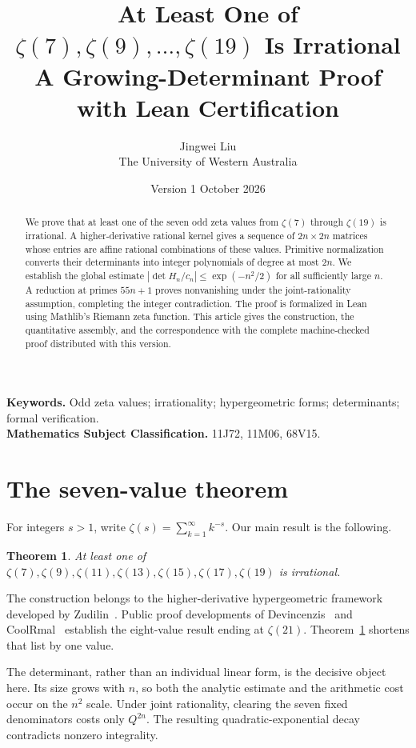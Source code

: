 \documentclass[11pt]{article}
\title{At Least One of $\zeta(7),\zeta(9),\ldots,\zeta(19)$ Is Irrational\\[5pt]
\large A Growing-Determinant Proof with Lean Certification}
\author{Jingwei Liu\\\small The University of Western Australia}
\date{Version 1\quad\textbar\quad 6 October 2026}
\newtheorem{theorem}{Theorem}[section]
\begin{document}
\maketitle
\begin{abstract}
We prove that at least one of the seven odd zeta values from
$\zeta(7)$ through $\zeta(19)$ is irrational.
A higher-derivative rational kernel gives a sequence of
$2n\times2n$ matrices whose entries are affine rational combinations of
these values. Primitive normalization converts their determinants into
integer polynomials of degree at most $2n$. We establish the global estimate
$|\det H_n/c_n|\leq \exp(-n^2/2)$ for all sufficiently large $n$.
A reduction at primes $55n+1$ proves nonvanishing under the joint-rationality
assumption, completing the integer contradiction. The proof is formalized
in Lean using Mathlib's Riemann zeta function. This article gives the
construction, the quantitative assembly, and the correspondence with the
complete machine-checked proof distributed with this version.
\end{abstract}
\noindent\textbf{Keywords.} Odd zeta values; irrationality; hypergeometric
forms; determinants; formal verification.\\
\textbf{Mathematics Subject Classification.} 11J72, 11M06, 68V15.

\section{The seven-value theorem}
For integers $s>1$, write $\zeta(s)=\sum_{k=1}^{\infty}k^{-s}$.
Our main result is the following.
\begin{theorem}\label{thm:main}
At least one of $\zeta(7),\zeta(9),\zeta(11),\zeta(13),\zeta(15),
\zeta(17),\zeta(19)$ is irrational.
\end{theorem}
The construction belongs to the higher-derivative hypergeometric framework
developed by Zudilin~\cite{zudilin}. Public proof developments of
Devincenzis~\cite{devincenzis} and CoolRmal~\cite{coolrmal} establish the
eight-value result ending at $\zeta(21)$. Theorem~\ref{thm:main} shortens
that list by one value.

The determinant, rather than an individual linear form, is the decisive
object here. Its size grows with $n$, so both the analytic estimate and
the arithmetic cost occur on the $n^2$ scale. Under joint rationality,
clearing the seven fixed denominators costs only $Q^{2n}$. The resulting
quadratic-exponential decay contradicts nonzero integrality.
\end{document}

